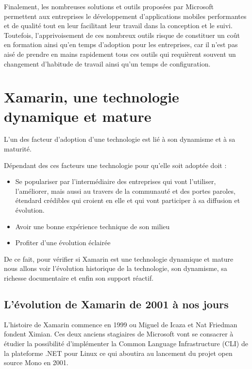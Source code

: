 \documentclass[11]{article}
\begin{document}
\vspace{0.5cm}
   
Finalement, les nombreuses solutions et outils proposées par Microsoft permettent aux entreprises le développement d’applications mobiles performantes et de qualité tout en leur facilitant leur travail dans la conception et le suivi. Toutefois, l’apprivoisement de ces nombreux outils risque de constituer un coût en formation ainsi qu’en temps d’adoption pour les entreprises, car il n’est pas aisé de prendre en mains rapidement tous ces outils qui requièrent souvent un changement d’habitude de travail ainsi qu’un temps de configuration.

 
 
 
 \section{Xamarin, une technologie dynamique et mature}
L'un des facteur d'adoption d'une technologie est lié à son dynamisme et à sa maturité.
      
\vspace{0.5cm}
   
Dépendant des ces facteurs une technologie pour qu'elle soit adoptée doit :

\begin{itemize}
\item Se populariser par l’intermédiaire des entreprises qui vont l’utiliser, l’améliorer, mais aussi au travers de la communauté et des portes paroles, étendard crédibles qui croient en elle et qui vont participer à sa diffusion et évolution.
\item Avoir une bonne expérience technique de son milieu
\item Profiter d’une évolution éclairée
\end{itemize}
 
 
\vspace{0.5cm}
   
De ce fait, pour vérifier si Xamarin est une technologie dynamique et mature nous allons voir l’évolution historique de la technologie, son dynamisme, sa richesse documentaire et enfin son support réactif.

\subsection{L’évolution de Xamarin de 2001 à nos jours}
 
 L’histoire de Xamarin commence en 1999 ou Miguel de Icaza et Nat Friedman fondent Ximian. Ces deux anciens stagiaires de Microsoft vont se consacrer à étudier la possibilité d’implémenter la Common Language Infrastructure (CLI) de la plateforme .NET pour Linux ce qui aboutira au lancement du projet open source Mono en 2001.
      
\end{document}
